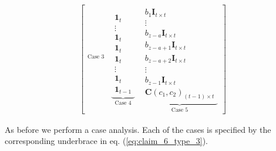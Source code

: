\documentclass[journal,twocolumn]{IEEEtran}
\theoremstyle{definition}
\newcommand{\bfI}{\mathbf{I}}
\newcommand{\bfC}{\mathbf{C}}
\newcommand{\bfzr}{\mathbf{0}}
\newcommand{\bfoe}{\mathbf{1}}
\begin{document}
\begin{itemize}
\begin{table*}
\begin{align}
\begin{bmatrix}
{	    	}_{\text{Case 3}}
	    &
	    \underbrace{
	    	\begin{array}{c}
	    	\bfoe_{t}\\
	    	\vdots\\
	    	\bfoe_{t}\\
	    	\bfoe_{t}\\
	    	\bfoe_{t}\\
	    	\vdots\\
	    	\bfoe_{t}\\
	    	\bfoe_{t-1}
	    	\end{array}
	    }_{\text{Case 4}}
	    &
	    	\underbrace{
	    		\begin{array}{c}
	    		{b_1}\bfI_{t\times t}\\
	    		\vdots\\
	    		{b_{z-a}}\bfI_{t\times t}\\
	    		{b_{z-a+1}}\bfI_{t\times t}\\
	    		{b_{z-a+2}}\bfI_{t\times t}\\
	    		\vdots\\
	    		{b_{z-1}}\bfI_{t\times t}\\
	    		\bfC(c_1, c_2)_{(t-1)\times t}
	    		\end{array}
	    	}_{\text{Case 5}}
		\end{bmatrix}
    \label{eq:claim_6_type_3}
	\end{align}
	\end{table*}
As before we perform a case analysis. Each of the cases is specified by the corresponding underbrace in eq. (\ref{eq:claim_6_type_3}).


\end{itemize}
\end{document}
